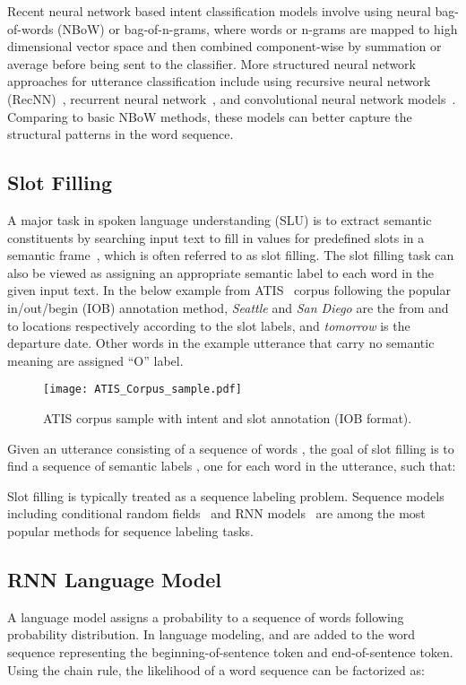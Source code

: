 \documentclass[11pt]{article}
\begin{document}
Recent neural network based intent classification models involve using neural bag-of-words (NBoW) or bag-of-n-grams, where words or n-grams are mapped to high dimensional vector space and then combined component-wise by summation or average before being sent to the classifier. More structured neural network approaches for utterance classification include using recursive neural network (RecNN)~\cite{guo:14}, recurrent neural network~\cite{ravuri:15}, and convolutional neural network models~\cite{collobert:08,kim:14}. Comparing to basic NBoW methods, these models can better capture the structural patterns in the word sequence.

\subsection{Slot Filling}
    A major task in spoken language understanding (SLU) is to extract semantic constituents by searching input text to fill in values for predefined slots in a semantic frame~\cite{mesnil:15}, which is often referred to as slot filling. The slot filling task can also be viewed as assigning an appropriate semantic label to each word in the given input text. In the below example from ATIS~\cite{hemphill:90} corpus following the popular in/out/begin (IOB) annotation method, \textit{Seattle} and \textit{San Diego} are the from and to locations respectively according to the slot labels, and \textit{tomorrow} is the departure date. Other words in the example utterance that carry no semantic meaning are assigned ``O'' label. 
    
    \begin{figure}[h]
        \centering
        \texttt{[image: ATIS\_Corpus\_sample.pdf]}
        \caption{{ATIS corpus sample with intent and slot annotation (IOB format). }}
        \label{fig:slot_filling_example.pdf}
    \end{figure}
    
    Given an utterance consisting of a sequence of words , the goal of slot filling is to find a sequence of semantic labels , one for each word in the utterance, such that:
        
    Slot filling is typically treated as a sequence labeling problem. Sequence models including conditional random fields~\cite{raymond:07} and RNN models~\cite{yao:14,mesnil:15,liu:15} are among the most popular methods for sequence labeling tasks. 

\subsection{RNN Language Model}
    A language model assigns a probability to a sequence of words  following probability distribution. In language modeling,  and  are added to the word sequence representing the beginning-of-sentence token and end-of-sentence token. Using the chain rule, the likelihood of a word sequence can be factorized as:
        
\end{document}

